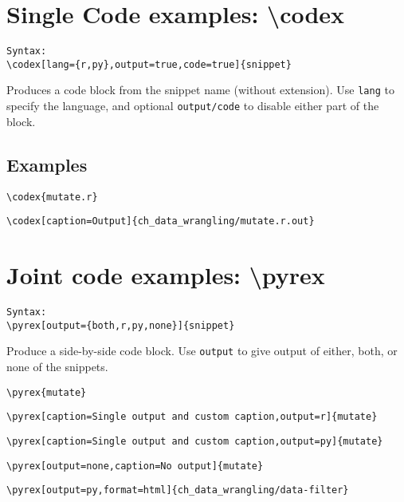 \documentclass{article}
\begin{document}
\section{Single Code examples: \textbackslash codex}

\begin{verbatim}
Syntax:
\codex[lang={r,py},output=true,code=true]{snippet}
\end{verbatim}

Produces a code block from the snippet name (without extension).
Use \verb+lang+ to specify the language, and optional \verb+output/code+ to disable either part of the block.

\subsection*{Examples}

\verb+\codex{mutate.r}+


\verb+\codex[caption=Output]{ch_data_wrangling/mutate.r.out}+

\newpage

\section{Joint code examples: \textbackslash pyrex}


\begin{verbatim}
Syntax:
\pyrex[output={both,r,py,none}]{snippet}
\end{verbatim}

Produce a side-by-side code block. Use \verb+output+ to give output of either, both, or none of the snippets. 

\verb+\pyrex{mutate}+

\verb+\pyrex[caption=Single output and custom caption,output=r]{mutate}+

\verb+\pyrex[caption=Single output and custom caption,output=py]{mutate}+

\verb+\pyrex[output=none,caption=No output]{mutate}+


\verb+\pyrex[output=py,format=html]{ch_data_wrangling/data-filter}+
\end{document}
